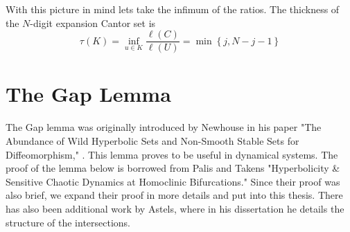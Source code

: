 \begin{example}
    With this picture in mind lets take the infimum of the ratios.  The thickness of the $N$\hyphen{digit} expansion Cantor set is 
    $$\tau(K) = \inf_{u\in K}\frac{\ell(C)}{\ell(U)} = \min\left\{j,N-j-1\right\}$$
\end{example}  
\section{The Gap Lemma}

The Gap lemma was originally introduced by Newhouse in his paper "The Abundance of Wild Hyperbolic Sets and Non-Smooth Stable Sets for Diffeomorphism," \cite{Newhouse}.  This lemma proves to be useful in dynamical systems. The proof of the lemma below is borrowed from Palis and Takens "Hyperbolicity \& Sensitive Chaotic Dynamics at Homoclinic Bifurcations." Since their proof was also brief, we expand their proof in more details and put into this thesis.  There has also been additional work by Astels, where in his dissertation \cite{Astels} he details the structure of the intersections. 




